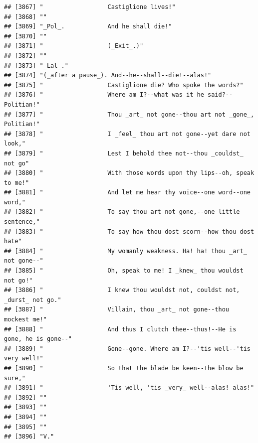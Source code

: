 \documentclass{article}\usepackage[]{graphicx}\usepackage[]{color}
\makeatletter
\newenvironment{kframe}{%
 \def\at@end@of@kframe{}%
 \ifinner\ifhmode%
  \def\at@end@of@kframe{\end{minipage}}%
  \begin{minipage}{\columnwidth}%
 \fi\fi%
 \def\FrameCommand##1{\hskip\@totalleftmargin \hskip-\fboxsep
 \colorbox{shadecolor}{##1}\hskip-\fboxsep
     \hskip-\linewidth \hskip-\@totalleftmargin \hskip\columnwidth}%
 \MakeFramed {\advance\hsize-\width
   \@totalleftmargin\z@ \linewidth\hsize
   \@setminipage}}%
 {\par\unskip\endMakeFramed%
 \at@end@of@kframe}
\newenvironment{knitrout}{}{} %
\makeatother
\begin{document}
\begin{knitrout}
\begin{kframe}
\begin{verbatim}
## [3867] "                  Castiglione lives!"                                        
## [3868] ""                                                                            
## [3869] "_Pol_.            And he shall die!"                                         
## [3870] ""                                                                            
## [3871] "                  (_Exit_.)"                                                 
## [3872] ""                                                                            
## [3873] "_Lal_."                                                                      
## [3874] "(_after a pause_). And--he--shall--die!--alas!"                              
## [3875] "                  Castiglione die? Who spoke the words?"                     
## [3876] "                  Where am I?--what was it he said?--Politian!"              
## [3877] "                  Thou _art_ not gone--thou art not _gone_, Politian!"       
## [3878] "                  I _feel_ thou art not gone--yet dare not look,"            
## [3879] "                  Lest I behold thee not--thou _couldst_ not go"             
## [3880] "                  With those words upon thy lips--oh, speak to me!"          
## [3881] "                  And let me hear thy voice--one word--one word,"            
## [3882] "                  To say thou art not gone,--one little sentence,"           
## [3883] "                  To say how thou dost scorn--how thou dost hate"            
## [3884] "                  My womanly weakness. Ha! ha! thou _art_ not gone--"        
## [3885] "                  Oh, speak to me! I _knew_ thou wouldst not go!"            
## [3886] "                  I knew thou wouldst not, couldst not, _durst_ not go."     
## [3887] "                  Villain, thou _art_ not gone--thou mockest me!"            
## [3888] "                  And thus I clutch thee--thus!--He is gone, he is gone--"   
## [3889] "                  Gone--gone. Where am I?--'tis well--'tis very well!"       
## [3890] "                  So that the blade be keen--the blow be sure,"              
## [3891] "                  'Tis well, 'tis _very_ well--alas! alas!"                  
## [3892] ""                                                                            
## [3893] ""                                                                            
## [3894] ""                                                                            
## [3895] ""                                                                            
## [3896] "V."                                                                          

\end{verbatim}
\end{kframe}
\end{knitrout}
\end{document}
